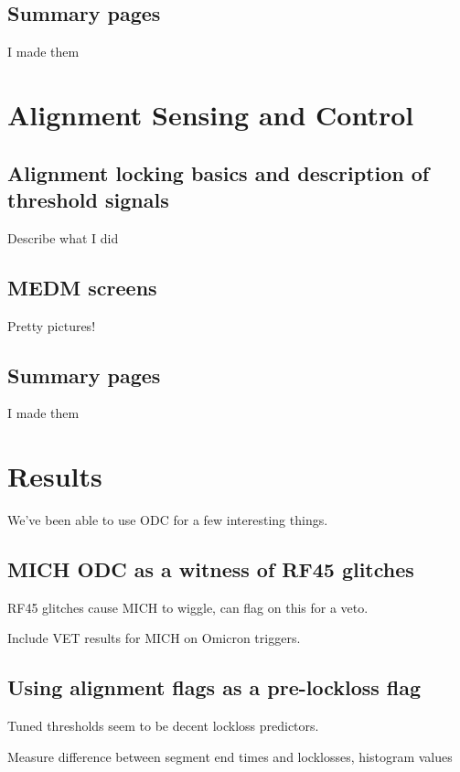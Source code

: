 \subsection{Summary pages}
I made them

\section{Alignment Sensing and Control}

\subsection{Alignment locking basics and description of threshold signals}

Describe what I did

\subsection{MEDM screens}
Pretty pictures!

\subsection{Summary pages}
I made them

\section{Results}

We've been able to use ODC for a few interesting things.

\subsection{MICH ODC as a witness of RF45 glitches}

RF45 glitches cause MICH to wiggle, can flag on this for a veto. 

Include VET results for MICH on Omicron triggers.

\subsection{Using alignment flags as a pre-lockloss flag}

Tuned thresholds seem to be decent lockloss predictors.

Measure difference between segment end times and locklosses, histogram values


